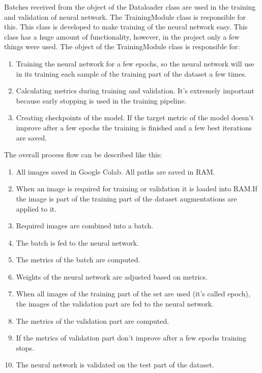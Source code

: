 Batches received from the object of the Dataloader class are used in the training and validation of neural network. The TrainingModule class is responsible for this.
This class is developed to make training of the neural network easy. This class has a huge amount of functionality, however, in the project only a few things were used.
The object of the TrainingModule class is responsible for:
\begin{enumerate}
    \item Training the neural network for a few epochs, so the neural network will use in its training each sample of the training part of the dataset a few times.
    \item Calculating metrics during training and validation. It's extremely important because early stopping is used in the training pipeline.
    \item Creating checkpoints of the model. If the target metric of the model doesn't improve after a few epochs the training is finished and a few best iterations are saved.
\end{enumerate}
The overall process flow can be described like this:
\begin{enumerate}
    \item All images saved in Google Colab. All paths are saved in RAM.\@
    \item When an image is required for training or validation it is loaded into RAM.\@ If the image is part of the training part of the dataset augmentations are applied to it.
    \item Required images are combined into a batch.
    \item The batch is fed to the neural network.
    \item The metrics of the batch are computed.
    \item Weights of the neural network are adjusted based on metrics.
    \item When all images of the training part of the set are used (it's called epoch), the images of the validation part are fed to the neural network.
    \item The metrics of the validation part are computed.
    \item If the metrics of validation part don't improve after a few epochs training stops.
    \item The neural network is validated on the test part of the dataset. 
\end{enumerate}

